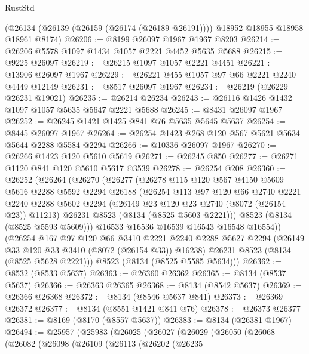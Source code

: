 \begin{lexlean}{RustStd}
\begin{coremodule}
    (@26134 (@26139 (@26159 (@26174 (@26189 @26191)))) @18952 @18955 @18958 @18961 @8174)
@26206 := @8199 @26097 @1967 @1967 @8203
@26214 := @26206 @5578 @1097 @1434 @1057 @2221 @4452 @5635 @5688
@26215 := @9225 @26097
@26219 := @26215 @1097 @1057 @2221 @4451
@26221 := @13906 @26097 @1967
@26229 := @26221 @455 @1057 @97 @66 @2221 @2240 @4449 @12149
@26231 := @8517 @26097 @1967
@26234 := @26219 (@26229 @26231 @19021)
@26235 := @26214 @26234
@26243 := @26116 @1426 @1432 @1097 @1057 @5635 @5647 @2221 @5688
@26245 := @8431 @26097 @1967
@26252 := @26245 @1421 @1425 @841 @76 @5635 @5645 @5637
@26254 := @8445 @26097 @1967
@26264 := @26254 @1423 @268 @120 @567 @5621 @5634 @5644 @2288 @5584 @2294
@26266 := @10336 @26097 @1967
@26270 := @26266 @1423 @120 @5610 @5619
@26271 := @26245 @850
@26277 := @26271 @1120 @841 @120 @5610 @5617 @3539
@26278 := @26254 @208
@26360 := @26252
    (@26264
      (@26270
        (@26277
          (@26278
            @115
            @120
            @567
            @4150
            @5609
            @5616
            @2288
            @5592
            @2294
            @26188
            (@26254
              @113
              @97
              @120
              @66
              @2740
              @2221
              @2240
              @2288
              @5602
              @2294
              (@26149 @23 @120 @23 @2740 (@8072 (@26154 @23)) @11213)
              @26231
              @8523
              (@8134 (@8525 @5603 @2221)))
            @8523
            (@8134 (@8525 @5593 @5609)))
          @16533
          @16536
          @16539
          @16543
          @16548
          @16554))
      (@26254
        @167
        @97
        @120
        @66
        @3410
        @2221
        @2240
        @2288
        @5627
        @2294
        (@26149 @33 @120 @33 @3410 (@8072 (@26154 @33)) @16238)
        @26231
        @8523
        (@8134 (@8525 @5628 @2221)))
      @8523
      (@8134 (@8525 @5585 @5634)))
@26362 := @8532 (@8533 @5637)
@26363 := @26360 @26362
@26365 := @8134 (@8537 @5637)
@26366 := @26363 @26365
@26368 := @8134 (@8542 @5637)
@26369 := @26366 @26368
@26372 := @8134 (@8546 @5637 @841)
@26373 := @26369 @26372
@26377 := @8134 (@8551 @1421 @841 @76)
@26378 := @26373 @26377
@26381 := @8169 (@8170 (@8557 @5637))
@26383 := @8134 (@26381 @1967)
@26494 := @25957
    (@25983
      (@26025
        (@26027
          (@26029
            (@26050
              (@26068
                (@26082
                  (@26098
                    (@26109
                      (@26113
                        (@26202
                          (@26235

\end{coremodule}
\end{lexlean}
